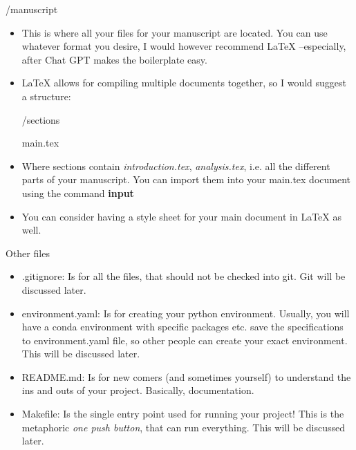 \documentclass{beamer}
\begin{document}
\begin{frame}{/manuscript}
    \begin{itemize}
        \item This is where all your files for your manuscript are located. You can use whatever format you desire, I would however recommend LaTeX –especially, after Chat GPT makes the boilerplate easy.
        \item LaTeX allows for compiling multiple documents together, so I would suggest a structure:
        \begin{semiverbatim}
    
/sections

main.tex
\end{semiverbatim}
    \item Where sections contain \textit{introduction.tex}, \textit{analysis.tex}, i.e. all the different parts of your manuscript. You can import them into your main.tex document using the command \textbf{input}
    \item You can consider having a style sheet for your main document in LaTeX as well.
    \end{itemize}
\end{frame}

\begin{frame}{Other files}
    \begin{itemize}
        \item .gitignore: Is for all the files, that should not be checked into git. Git will be discussed later.
        \item environment.yaml: Is for creating your python environment. Usually, you will have a conda environment with specific packages etc. save the specifications to environment.yaml file, so other people can create your exact environment. This will be discussed later.
        \item README.md: Is for new comers (and sometimes yourself) to understand the ins and outs of your project. Basically, documentation.
        \item Makefile: Is the single entry point used for running your project! This is the metaphoric \textit{one push button}, that can run everything. This will be discussed later.
    \end{itemize}
    
\end{frame}
\end{document}
